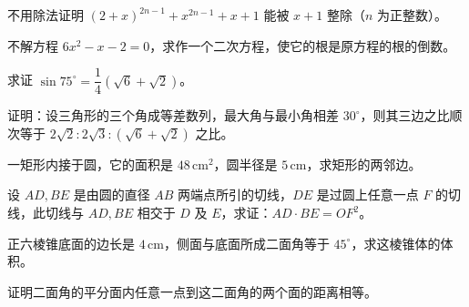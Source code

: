 

\begin{question}
不用除法证明 $(2+x)^{2n-1}+x^{2n-1}+x+1$ 能被 $x+1$ 整除（$n$ 为正整数）。

\end{question}
\begin{question}
不解方程 $6x^2-x-2=0$，求作一个二次方程，使它的根是原方程的根的倒数。

\end{question}
\begin{question}
求证 $\sin 75^\circ=\dfrac14\left(\sqrt6+\sqrt2\right)$。

\end{question}
\begin{question}
证明：设三角形的三个角成等差数列，最大角与最小角相差 $30^\circ$，则其三边之比顺次等于 $2\sqrt2:2\sqrt3:(\sqrt6+\sqrt2)$ 之比。

\end{question}
\begin{question}
一矩形内接于圆，它的面积是 $48\,\text{cm}^2$，圆半径是 $5\,\text{cm}$，求矩形的两邻边。

\end{question}
\begin{question}
设 $AD,BE$ 是由圆的直径 $AB$ 两端点所引的切线，$DE$ 是过圆上任意一点 $F$ 的切线，此切线与 $AD,BE$ 相交于 $D$ 及 $E$，求证：$AD\cdot BE=OF^2$。

\end{question}
\begin{question}
正六棱锥底面的边长是 $4\,\text{cm}$，侧面与底面所成二面角等于 $45^\circ$，求这棱锥体的体积。

\end{question}
\begin{question}
证明二面角的平分面内任意一点到这二面角的两个面的距离相等。

\end{question}
